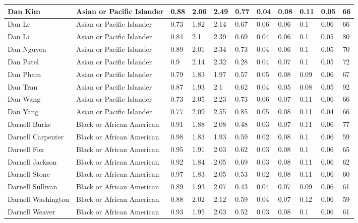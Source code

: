 \begin{table}[!ht]
\begin{tabular}{|l|l|l|l|l|l|l|l|l|l|l|}
        Dan Kim & Asian or Pacific Islander & 0.88 & 2.06 & 2.49 & 0.77 & 0.04 & 0.08 & 0.11 & 0.05 & 66 \\ \hline
        Dan Le & Asian or Pacific Islander & 0.73 & 1.82 & 2.14 & 0.67 & 0.06 & 0.06 & 0.1 & 0.06 & 66 \\ \hline
        Dan Li & Asian or Pacific Islander & 0.84 & 2.1 & 2.39 & 0.69 & 0.04 & 0.06 & 0.1 & 0.05 & 80 \\ \hline
        Dan Nguyen & Asian or Pacific Islander & 0.89 & 2.01 & 2.34 & 0.73 & 0.04 & 0.06 & 0.1 & 0.05 & 70 \\ \hline
        Dan Patel & Asian or Pacific Islander & 0.9 & 2.14 & 2.32 & 0.28 & 0.04 & 0.07 & 0.1 & 0.05 & 72 \\ \hline
        Dan Pham & Asian or Pacific Islander & 0.79 & 1.83 & 1.97 & 0.57 & 0.05 & 0.08 & 0.09 & 0.06 & 67 \\ \hline
        Dan Tran & Asian or Pacific Islander & 0.87 & 1.93 & 2.1 & 0.62 & 0.04 & 0.05 & 0.08 & 0.05 & 92 \\ \hline
        Dan Wang & Asian or Pacific Islander & 0.73 & 2.05 & 2.23 & 0.73 & 0.06 & 0.07 & 0.11 & 0.06 & 66 \\ \hline
        Dan Yang & Asian or Pacific Islander & 0.77 & 2.09 & 2.55 & 0.85 & 0.05 & 0.08 & 0.11 & 0.04 & 66 \\ \hline
        Darnell Burke & Black or African American & 0.91 & 1.88 & 2.08 & 0.48 & 0.03 & 0.07 & 0.11 & 0.06 & 77 \\ \hline
        Darnell Carpenter & Black or African American & 0.98 & 1.83 & 1.93 & 0.59 & 0.02 & 0.08 & 0.1 & 0.06 & 59 \\ \hline
        Darnell Fox & Black or African American & 0.95 & 1.91 & 2.03 & 0.62 & 0.03 & 0.08 & 0.1 & 0.06 & 65 \\ \hline
        Darnell Jackson & Black or African American & 0.92 & 1.84 & 2.05 & 0.69 & 0.03 & 0.08 & 0.11 & 0.06 & 62 \\ \hline
        Darnell Stone & Black or African American & 0.97 & 1.83 & 2.05 & 0.53 & 0.02 & 0.08 & 0.11 & 0.06 & 60 \\ \hline
        Darnell Sullivan & Black or African American & 0.89 & 1.93 & 2.07 & 0.43 & 0.04 & 0.07 & 0.09 & 0.06 & 61 \\ \hline
        Darnell Washington & Black or African American & 0.88 & 2.02 & 2.12 & 0.59 & 0.04 & 0.07 & 0.12 & 0.06 & 59 \\ \hline
        Darnell Weaver & Black or African American & 0.93 & 1.95 & 2.03 & 0.52 & 0.03 & 0.08 & 0.1 & 0.06 & 61 \\ \hline

\end{tabular}
\end{table}
